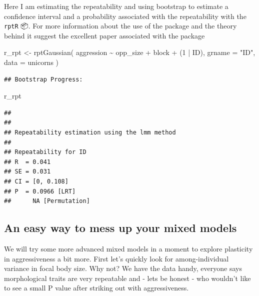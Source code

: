 \documentclass[
  12pt,
]{book}
\newenvironment{Shaded}{\begin{snugshade}}{\end{snugshade}}
\newcommand{\AttributeTok}[1]{\textcolor[rgb]{0.77,0.63,0.00}{#1}}
\newcommand{\DecValTok}[1]{\textcolor[rgb]{0.00,0.00,0.81}{#1}}
\newcommand{\FunctionTok}[1]{\textcolor[rgb]{0.00,0.00,0.00}{#1}}
\newcommand{\NormalTok}[1]{#1}
\newcommand{\OtherTok}[1]{\textcolor[rgb]{0.56,0.35,0.01}{#1}}
\newcommand{\SpecialCharTok}[1]{\textcolor[rgb]{0.00,0.00,0.00}{#1}}
\newcommand{\StringTok}[1]{\textcolor[rgb]{0.31,0.60,0.02}{#1}}
\begin{document}
Here I am estimating the repeatability and using bootstrap to estimate a confidence interval and a probability associated with the repeatability with the \texttt{rptR} 📦. For more information about the use of the package and the theory behind it suggest the excellent paper associated with the package \citep{rptR2017}

\begin{Shaded}
\begin{Highlighting}[]
\NormalTok{r\_rpt }\OtherTok{\textless{}{-}} \FunctionTok{rptGaussian}\NormalTok{(}
\NormalTok{  aggression }\SpecialCharTok{\textasciitilde{}}\NormalTok{ opp\_size }\SpecialCharTok{+}\NormalTok{ block }\SpecialCharTok{+}\NormalTok{ (}\DecValTok{1} \SpecialCharTok{|}\NormalTok{ ID),}
  \AttributeTok{grname =} \StringTok{"ID"}\NormalTok{, }\AttributeTok{data =}\NormalTok{ unicorns}
\NormalTok{)}
\end{Highlighting}
\end{Shaded}

\begin{verbatim}
## Bootstrap Progress:
\end{verbatim}

\begin{Shaded}
\begin{Highlighting}[]
\NormalTok{r\_rpt}
\end{Highlighting}
\end{Shaded}

\begin{verbatim}
## 
## 
## Repeatability estimation using the lmm method 
## 
## Repeatability for ID
## R  = 0.041
## SE = 0.031
## CI = [0, 0.108]
## P  = 0.0966 [LRT]
##      NA [Permutation]
\end{verbatim}

\hypertarget{an-easy-way-to-mess-up-your-mixed-models}{%
\subsection{An easy way to mess up your mixed models}\label{an-easy-way-to-mess-up-your-mixed-models}}

We will try some more advanced mixed models in a moment to explore plasticity in aggressiveness a bit more. First let's quickly look for among-individual variance in focal body size. Why not? We have the data handy, everyone says morphological traits are very repeatable and - lets be honest - who wouldn't like to see a small P value after striking out with aggressiveness.
\end{document}
